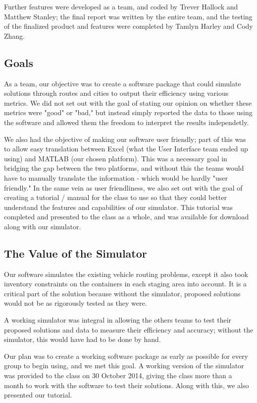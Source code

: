 \documentclass{article}
\begin{document}
Further features were developed as a team, and coded by Trever Hallock and Matthew Stanley; the final report was written by the entire team, and the testing of the finalized product and features were completed by Tamlyn Harley and Cody Zhang.


\subsection{Goals}

As a team, our objective was to create a software package that could simulate solutions through routes and cities to output their efficiency using various metrics.  We did not set out with the goal of stating our opinion on whether these metrics were "good" or "bad," but instead simply reported the data to those using the software and allowed them the freedom to interpret the results independetly. 

We also had the objective of making our software user friendly; part of this was to allow easy translation between Excel (what the User Interface team ended up using) and MATLAB (our chosen platform).  This was a necessary goal in bridging the gap between the two platforms, and without this the teams would have to manually translate the information - which would be hardly "user friendly."  In the same vein as user friendliness, we also set out with the goal of creating a tutorial / manual for the class to use so that they could better understand the features and capabilities of our simulator.  This tutorial was completed and presented to the class as a whole, and was available for download along with our simulator.


\subsection{The Value of the Simulator}

Our software simulates the existing vehicle routing problems, except it also took inventory constraints on the containers in each staging area into account. It is a critical part of the solution because without the simulator, proposed solutions would not be as rigorously tested as they were. 

A working simulator was integral in allowing the others teams to test their proposed solutions and data to measure their efficiency and accuracy; without the simulator, this would have had to be done by hand. 

Our plan was to create a working software package as early as possible for every group to begin using, and we met this goal. 
A working version of the simulator was provided to the class on 30 October 2014, giving the class more than a month to work with the software to test their solutions.  Along with this, we also presented our tutorial.
\end{document}
